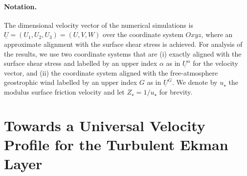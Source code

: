 \documentclass[a4paper,11pt]{article}
\begin{document}
\paragraph{Notation.} The dimensional velocity vector of the numerical simulations is $\underline{U} = (U_1,U_2,U_3) = (U,V,W)$ over the coordinate system
$Oxyz$, where an approximate alignment with the surface shear stress is achieved.
%
For analysis of the results, we use two coordinate systems that are
(i)  exactly aligned with the surface shear stress and labelled by an upper index $\alpha$ as in $\underline{U}^\alpha$ for the velocity vector, and
(ii) the coordinate system aligned with the free-atmosphere geostrophic wind labelled by an upper index $G$ as in $\underline{U}^G$.
%
We denote by $u_\star$ the modulus surface friction velocity and let $Z_\star=1/u_\star$ for brevity. 

\section{Towards a Universal Velocity Profile for the Turbulent Ekman Layer}
\end{document}
